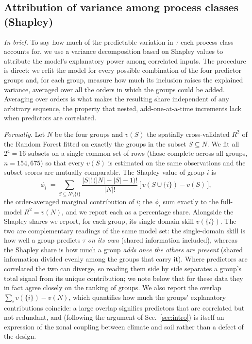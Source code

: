 \documentclass[12pt, a4paper]{article}
\begin{document}
\subsection{Attribution of variance among process classes (Shapley)}
\label{sec:shapley}
\textit{In brief.} To say how much of the predictable variation in $\tau$ each
process class accounts for, we use a variance decomposition based on Shapley
values to attribute the model's explanatory power among correlated inputs.
The procedure is direct: we refit the model for
every possible combination of the four predictor groups and, for each group,
measure how much its inclusion raises the explained variance, averaged over all
the orders in which the groups could be added. Averaging over orders is what
makes the resulting share independent of any arbitrary sequence, the property
that nested, add-one-at-a-time increments lack when predictors are correlated.

\textit{Formally.} Let $N$ be the four groups and $v(S)$ the spatially
cross-validated $R^2$ of the Random Forest fitted on exactly the groups in the
subset $S\subseteq N$. We fit all $2^{4}=16$ subsets on a single common set of
rows (those complete across all groups, $n=154{,}675$) so that every $v(S)$ is
estimated on the same observations and the subset scores are mutually
comparable. The Shapley value of group $i$ is
\begin{equation}
  \phi_i \;=\!\! \sum_{S\subseteq N\setminus\{i\}}
  \frac{|S|!\,\bigl(|N|-|S|-1\bigr)!}{|N|!}\,
  \bigl[\,v(S\cup\{i\})-v(S)\,\bigr],
  \label{eq:shapley}
\end{equation}
the order-averaged marginal contribution of $i$; the $\phi_i$ sum exactly to the
full-model $R^2=v(N)$, and we report each as a percentage share. Alongside the
Shapley shares we report, for each group, its single-domain skill $v(\{i\})$.
The two are complementary readings of the same model set: the single-domain
skill is how well a group predicts $\tau$ \emph{on its own} (shared information
included), whereas the Shapley share is how much a group \emph{adds once the
others are present} (shared information divided evenly among the groups that
carry it). Where predictors are correlated the two can diverge, so reading them
side by side separates a group's total signal from its unique contribution; we
note below that for these data they in fact agree closely on the ranking of
groups. We also report the overlap $\sum_i v(\{i\}) - v(N)$, which quantifies
how much the groups' explanatory contributions coincide: a large overlap
signifies predictors that are correlated but not redundant, and (following the
argument of Sec.~\ref{sec:intro}) is itself an expression of the zonal coupling
between climate and soil rather than a defect of the design.
\end{document}
